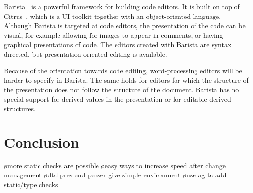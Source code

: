 \documentclass[12pt]{article}
\begin{document}





\noindent Barista~\cite{KoMyers06Barista} is a powerful framework for building code editors. It is built on top of Citrus~\cite{KoMyers05Citrus}, which is a UI toolkit together with an object-oriented language. Although Barista is targeted at code editors, the presentation of the code can be visual, for example allowing for images to appear in comments, or having graphical presentations of code. The editors created with Barista are syntax directed, but presentation-oriented editing is available. 

Because of the orientation towards code editing, word-processing editors will be harder to specify in Barista. The same holds for editors for which the structure of the presentation does not follow the structure of the document. Barista has no special support for derived values in the presentation or for editable derived structures.



%
\section{Conclusion} 
%

\bl
\o more static checks are possible
\o easy ways to increase speed after change management
\o dtd pres and parser give simple environment
\o use ag to add static/type checks
\el

%



\end{document}
